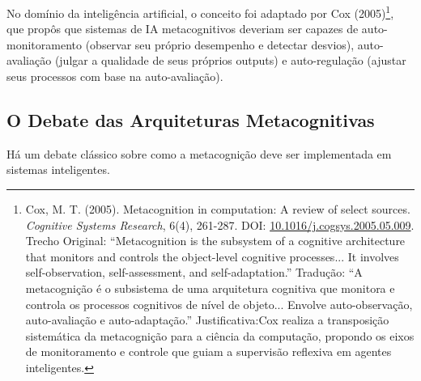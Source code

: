 \documentclass[12pt,a4paper,oneside]{abntex2}
\begin{document}
No domínio da inteligência artificial, o conceito foi adaptado por Cox (2005)\footnote{Cox, M. T. (2005). Metacognition in computation: A review of select sources. \textit{Cognitive Systems Research}, 6(4), 261-287. DOI: \href{https://doi.org/10.1016/j.cogsys.2005.05.009}{10.1016/j.cogsys.2005.05.009}. Trecho Original: ``Metacognition is the subsystem of a cognitive architecture that monitors and controls the object-level cognitive processes... It involves self-observation, self-assessment, and self-adaptation.'' Tradução: ``A metacognição é o subsistema de uma arquitetura cognitiva que monitora e controla os processos cognitivos de nível de objeto... Envolve auto-observação, auto-avaliação e auto-adaptação.'' Justificativa:Cox realiza a transposição sistemática da metacognição para a ciência da computação, propondo os eixos de monitoramento e controle que guiam a supervisão reflexiva em agentes inteligentes.}, que propôs que sistemas de IA metacognitivos deveriam ser capazes de auto-monitoramento (observar seu próprio desempenho e detectar desvios), auto-avaliação (julgar a qualidade de seus próprios outputs) e auto-regulação (ajustar seus processos com base na auto-avaliação). 

\subsection{O Debate das Arquiteturas Metacognitivas}

Há um debate clássico sobre como a metacognição deve ser implementada em sistemas inteligentes. 
\end{document}
